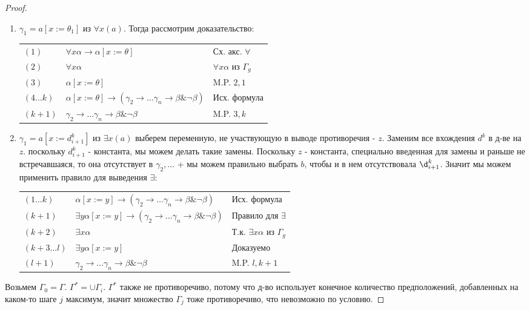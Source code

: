 \begin{proof}
\begin{enumerate}
\item $\gamma_1 = a[x:=\theta_1]$ из $\forall x (a)$. Тогда рассмотрим доказательство:\\
\begin{tabular}{lll}
$(1)$ & $\forall x \alpha \rightarrow \alpha [x := \theta]$ & Сх. акс. $\forall$\\
$(2)$ & $\forall x \alpha$ & $\forall x \alpha$ из $\Gamma_g$\\
$(3)$ & $\alpha [x := \theta]$ & M.P. $2,1$\\
$(4 \dots k)$ & $\alpha [x := \theta] \rightarrow (\gamma_2 \rightarrow \dots \gamma_n \rightarrow \beta \& \neg \beta)$ & Исх. формула\\
$(k+1)$ & $\gamma_2 \rightarrow \dots \gamma_n \rightarrow \beta \& \neg \beta$ & M.P. $3,k$
\end{tabular}
\item $\gamma_1 = a[x:=d_{i+1}^k]$ из $\exists x(a)$ выберем переменную, не участвующую в выводе противоречия - $z$. Заменим все вхождения $d^k$ в д-ве на $z$. поскольку $d_{i+1}^k$ - константа, мы можем делать такие замены. Поскольку $z$ - константа, специально введенная для замены и раньше не встречавшаяся, то она отсутствует в $\gamma_2,\dots$ + мы можем правильно выбрать $b$, чтобы и в нем отсутствовала $\d_{i+1}^k$. Значит мы можем применить правило для выведения $\exists$:\\
\begin{tabular}{lll}
$(1 \dots k)$ & $\alpha [x := y] \rightarrow (\gamma_2 \rightarrow \dots \gamma_n \rightarrow \beta \& \neg \beta)$ & Исх. формула\\
$(k+1)$ & $\exists y \alpha [x := y] \rightarrow (\gamma_2 \rightarrow \dots \gamma_n \rightarrow \beta \& \neg \beta)$ & Правило для $\exists$\\
$(k+2)$ & $\exists x \alpha$ & Т.к. $\exists x \alpha$ из $\Gamma_g$ \\
$(k+3 \dots l)$ & $\exists y \alpha [x := y]$ & Доказуемо \\
$(l+1)$ & $\gamma_2 \rightarrow \dots \gamma_n \rightarrow \beta \& \neg \beta$ & M.P. $l, k+1$
\end{tabular}
\end{enumerate}
Возьмем $\Gamma_0 = \Gamma$. $\Gamma^* = \cup \Gamma_i$. $\Gamma^*$ также не противоречиво, потому что д-во использует конечное количество предположений, добавленных на каком-то шаге $j$ максимум, значит множество $Γ_j$ тоже противоречиво, что невозможно по условию.
\end{proof}
